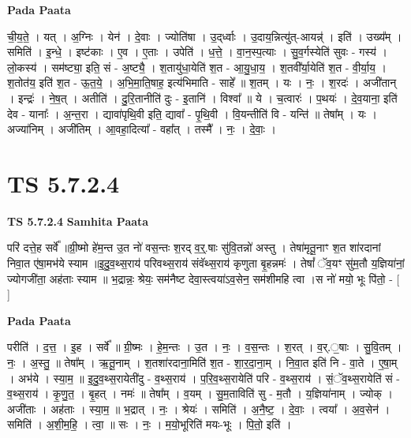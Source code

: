 \documentclass[17pt]{extarticle}
\begin{document}
\textbf{Pada Paata} \newline

ची॒य॒ते॒ । यत् । अ॒ग्निः । येन॑ । दे॒वाः । ज्योति॑षा । उ॒द्‌र्ध्वाः । उ॒दाय॒न्नित्यु॑त्-आयन्न्॑ । इति॑ । उख्य᳚म् । समिति॑ । इ॒न्धे॒ । इष्ट॑काः । ए॒व । ए॒ताः । उपेति॑ । ध॒त्ते॒ । वा॒न॒स्प॒त्याः । सु॒व॒र्गस्येति॑ सुवः - गस्य॑ । लो॒कस्य॑ । सम॑ष्ट्या॒ इति॒ सं - अ॒ष्ट्यै॒ । श॒तायु॑धा॒येति॑ श॒त - आ॒यु॒धा॒य॒ । श॒तवी᳚र्या॒येति॑ श॒त - वी॒र्या॒य॒ । श॒तोत॑य॒ इति॑ श॒त - ऊ॒त॒ये॒ । अ॒भि॒मा॒ति॒षाह॒ इत्य॑भिमाति -   साहे᳚ ॥ श॒तम् । यः । नः॒ । श॒रदः॑ । अजी॑तान् । इन्द्रः॑ । ने॒ष॒त् । अतीति॑ । दु॒रि॒तानीति॑ दुः - इ॒तानि॑ । विश्वा᳚ ॥ ये । च॒त्वारः॑ । प॒थयः॑ । दे॒व॒याना॒ इति॑ देव - यानाः᳚ । अ॒न्त॒रा । द्यावा॑पृथि॒वी इति॒ द्यावा᳚ - पृ॒थि॒वी । वि॒यन्तीति॑ वि - यन्ति॑ ॥ तेषा᳚म् । यः । अज्या॑निम् । अजी॑तिम् । आ॒वहा॒दित्या᳚ - वहा᳚त् । तस्मै᳚ । नः॒ । दे॒वाः॒ ।  \newline





\section{ TS 5.7.2.4 }

\textbf{TS 5.7.2.4 } \newline
\textbf{Samhita Paata} \newline

परि॑ दत्ते॒ह सर्वे᳚ ॥ग्री॒ष्मो हे॑म॒न्त उ॒त नो॑ वस॒न्तः श॒रद् व॒र्॒.षाः सु॑वि॒तन्नो॑ अस्तु । तेषा॑मृतू॒नाꣳ श॒त शा॑रदानां निवा॒त ए॑षा॒मभ॑ये स्याम ॥इ॒दु॒व॒थ्स॒राय॑ परिवथ्स॒राय॑ संवॅथ्स॒राय॑ कृणुता बृ॒हन्नमः॑ । तेषां᳚ ॅव॒यꣳ सु॑म॒तौ य॒ज्ञिया॑नां॒ ज्योगजी॑ता॒ अह॑ताः स्याम ॥ भ॒द्रान्नः॒ श्रेयः॒ सम॑नैष्ट देवा॒स्त्वया॑ऽव॒सेन॒ सम॑शीमहि त्वा ।स नो॑ मयो॒ भूः पि॑तो॒ - [  ] \newline

\textbf{Pada Paata} \newline

परीति॑ । द॒त्त॒ । इ॒ह । सर्वे᳚ ॥ ग्री॒ष्मः । हे॒म॒न्तः । उ॒त । नः॒ । व॒स॒न्तः । श॒रत् । व॒र्.॒षाः । सु॒वि॒तम् । नः॒ । अ॒स्तु॒ ॥ तेषा᳚म् । ऋ॒तू॒नाम् । श॒तशा॑रदाना॒मिति॑ श॒त - शा॒र॒दा॒ना॒म् । नि॒वा॒त इति॑ नि - वा॒ते । ए॒षा॒म् । अभ॑ये । स्या॒म॒ ॥ इ॒दु॒व॒थ्स॒रायेती॑दु - व॒थ्स॒राय॑ । प॒रि॒व॒थ्स॒रायेति॑ परि - व॒थ्स॒राय॑ । सं॒ॅव॒थ्स॒रायेति॑ सं - व॒थ्स॒राय॑ । कृ॒णु॒त॒ । बृ॒हत् । नमः॑ ॥ तेषा᳚म् । व॒यम् । सु॒म॒ताविति॑ सु - म॒तौ । य॒ज्ञिया॑नाम् । ज्योक् । अजी॑ताः । अह॑ताः । स्या॒म॒ ॥ भ॒द्रात् । नः॒ । श्रेयः॑ । समिति॑ । अ॒नै॒ष्ट॒ । दे॒वाः॒ । त्वया᳚ । अ॒व॒सेन॑ । समिति॑ । अ॒शी॒म॒हि॒ । त्वा॒ ॥ सः । नः॒ । म॒यो॒भूरिति॑ मयः-भूः । पि॒तो॒ इति॑ ।  \newline
\end{document}
